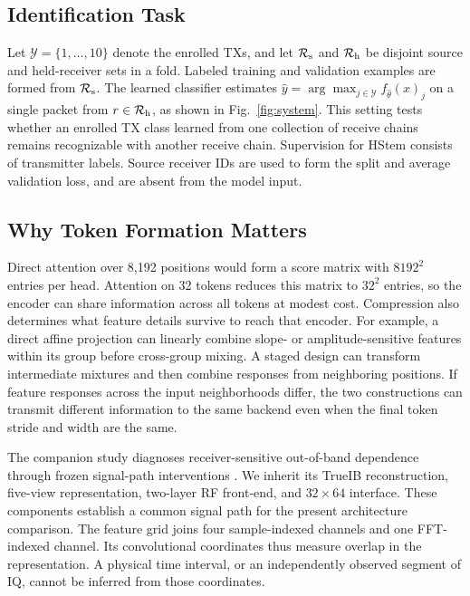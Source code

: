 \documentclass[journal]{IEEEtran}
\begin{document}
\subsection{Identification Task}
Let \(\mathcal Y=\{1,\ldots,10\}\) denote the enrolled TXs, and let \(\mathcal R_{\rm s}\) and \(\mathcal R_{\rm h}\) be disjoint source and held-receiver sets in a fold. Labeled training and validation examples are formed from \(\mathcal R_{\rm s}\). The learned classifier estimates \(\hat y=\arg\max_{j\in\mathcal Y} f_{\hat\theta}(x)_j\) on a single packet from \(r\in\mathcal R_{\rm h}\), as shown in Fig.~\ref{fig:system}. This setting tests whether an enrolled TX class learned from one collection of receive chains remains recognizable with another receive chain. Supervision for HStem consists of transmitter labels. Source receiver IDs are used to form the split and average validation loss, and are absent from the model input.

\subsection{Why Token Formation Matters}
Direct attention over 8,192 positions would form a score matrix with \(8192^2\) entries per head. Attention on 32 tokens reduces this matrix to \(32^2\) entries, so the encoder can share information across all tokens at modest cost. Compression also determines what feature details survive to reach that encoder. For example, a direct affine projection can linearly combine slope- or amplitude-sensitive features within its group before cross-group mixing. A staged design can transform intermediate mixtures and then combine responses from neighboring positions. If feature responses across the input neighborhoods differ, the two constructions can transmit different information to the same backend even when the final token stride and width are the same.

The companion study diagnoses receiver-sensitive out-of-band dependence through frozen signal-path interventions \cite{oobcompanion}. We inherit its TrueIB reconstruction, five-view representation, two-layer RF front-end, and \(32\times64\) interface. These components establish a common signal path for the present architecture comparison. The feature grid joins four sample-indexed channels and one FFT-indexed channel. Its convolutional coordinates thus measure overlap in the representation. A physical time interval, or an independently observed segment of IQ, cannot be inferred from those coordinates.
\end{document}
